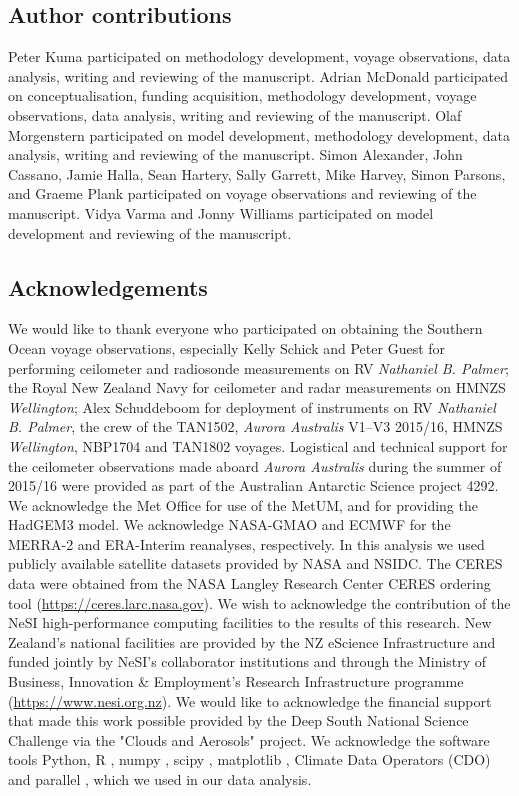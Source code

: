 \subsection*{Author contributions}

Peter Kuma participated on methodology development, voyage observations, data
analysis, writing and reviewing of the manuscript. Adrian McDonald participated
on conceptualisation, funding acquisition, methodology development, voyage
observations, data analysis, writing and reviewing of the manuscript. Olaf
Morgenstern participated on model development, methodology development, data
analysis, writing and reviewing of the manuscript. Simon Alexander, John
Cassano, Jamie Halla, Sean Hartery, Sally Garrett, Mike Harvey, Simon Parsons,
and Graeme Plank participated on voyage observations and reviewing of the
manuscript. Vidya Varma and Jonny Williams participated on model development
and reviewing of the manuscript.

\subsection*{Acknowledgements}

We would like to thank everyone who participated on obtaining the Southern
Ocean voyage observations, especially Kelly Schick and Peter Guest for
performing ceilometer and radiosonde measurements on RV \textit{Nathaniel B.
Palmer}; the Royal New Zealand Navy for ceilometer and radar measurements on
HMNZS \textit{Wellington}; Alex Schuddeboom for deployment of instruments on RV
\textit{Nathaniel B. Palmer}, the crew of the TAN1502, \textit{Aurora
Australis} V1--V3 2015/16, HMNZS \textit{Wellington}, NBP1704 and TAN1802
voyages.  Logistical and technical support for the ceilometer observations made
aboard \textit{Aurora Australis} during the summer of 2015/16 were provided as
part of the Australian Antarctic Science project 4292. We acknowledge the Met
Office for use of the MetUM, and for providing the HadGEM3 model. We
acknowledge NASA-GMAO and ECMWF for the MERRA-2 and ERA-Interim reanalyses,
respectively. In this analysis we used publicly available satellite datasets
provided by NASA and NSIDC. The CERES data were obtained from the NASA Langley
Research Center CERES ordering tool (\url{https://ceres.larc.nasa.gov}). We
wish to acknowledge the contribution of the NeSI high-performance computing
facilities to the results of this research. New Zealand's national facilities
are provided by the NZ eScience Infrastructure and funded jointly by NeSI's
collaborator institutions and through the Ministry of Business, Innovation \&
Employment's Research Infrastructure programme (\url{https://www.nesi.org.nz}).
We would like to acknowledge the financial support that made this work possible
provided by the Deep South National Science Challenge via the "Clouds and
Aerosols" project.  We acknowledge the software tools Python, R \citep{r},
numpy \citep{oliphant2006}, scipy \citep{scipy}, matplotlib \citep{hunter2007},
Climate Data Operators (CDO) \citep{schulzweida2018} and parallel
\citep{tange2011}, which we used in our data analysis.

\normalsize
\normalfont
